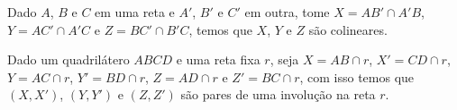 \begin{cor}
Dado $A$, $B$ e $C$ em uma reta e $A'$, $B'$ e $C'$ em outra, tome $X = AB' \cap A'B$, $Y = AC'\cap A'C$ e $Z = BC' \cap B'C$, temos que $X$, $Y$ e $Z$ são colineares.
\end{cor}


\begin{thm}
Dado um quadrilátero $ABCD$ e uma reta fixa $r$, seja $X = AB \cap r$, $X' = CD \cap r$, $Y = AC \cap r$, $Y' = BD \cap r$, $Z = AD \cap r$ e $Z' = BC \cap r$, com isso temos que $(X,X')$, $(Y,Y')$ e $(Z,Z')$ são pares de uma involução na reta $r$.
    
\end{thm}
